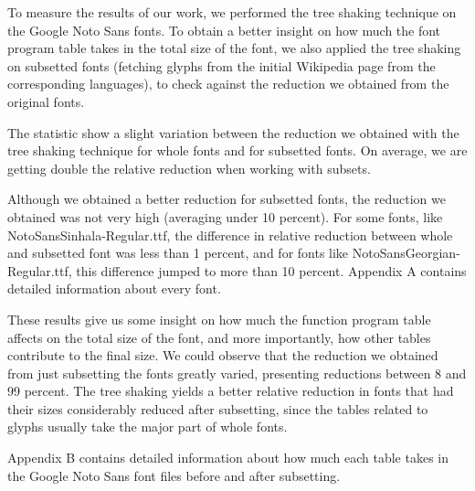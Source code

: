 \documentclass[12pt]{article}
\begin{document}
To measure the results of our work, we performed the tree shaking
technique on the Google Noto Sans fonts\cite{notosans}. To obtain a
better insight on how much the font program table takes in the total
size of the font, we also applied the tree shaking on subsetted fonts
(fetching glyphs from the initial Wikipedia page from the corresponding
languages), to check against the reduction we obtained from the original
fonts.



The statistic show a slight variation between the reduction we obtained
with the tree shaking technique for whole fonts and for subsetted fonts.
On average, we are getting double the relative reduction when working
with subsets. 

Although we obtained a better reduction for subsetted fonts, the
reduction we obtained was not very high (averaging under 10 percent). For
some fonts, like NotoSansSinhala-Regular.ttf, the difference in relative
reduction between whole and subsetted font was less than 1 percent, and
for fonts like NotoSansGeorgian-Regular.ttf, this difference jumped to
more than 10 percent. Appendix A contains detailed information about every font.

These results give us some insight on how much the function program
table affects on the total size of the font, and more importantly, how
other tables contribute to the final size. We could observe that the
reduction we obtained from just subsetting the fonts greatly
varied, presenting reductions between 8 and 99 percent. The tree shaking
yields a better relative reduction in fonts that had their sizes
considerably reduced after subsetting, since the tables related to
glyphs usually take the major part of whole fonts.

Appendix B contains detailed information about how much each table takes
in the Google Noto Sans font files before and after subsetting.
\end{document}
